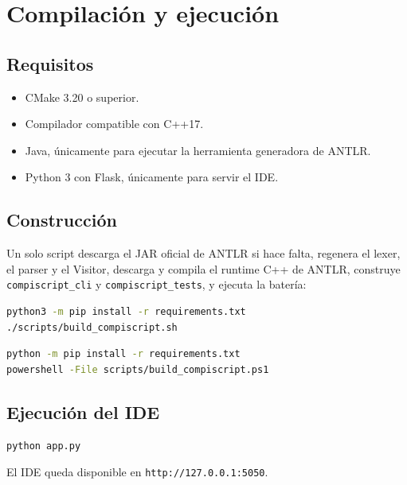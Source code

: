 \documentclass[11pt,a4paper]{article}
\begin{document}
\section{Compilación y ejecución}

\subsection{Requisitos}

\begin{itemize}[leftmargin=1.4em]
  \item CMake 3.20 o superior.
  \item Compilador compatible con C++17.
  \item Java, únicamente para ejecutar la herramienta generadora de ANTLR.
  \item Python 3 con Flask, únicamente para servir el IDE.
\end{itemize}

\subsection{Construcción}

Un solo script descarga el JAR oficial de ANTLR si hace falta, regenera el
lexer, el parser y el Visitor, descarga y compila el runtime C++ de ANTLR,
construye \texttt{compiscript\_cli} y \texttt{compiscript\_tests}, y ejecuta la
batería:

\begin{lstlisting}[language=bash,caption={macOS o Linux.}]
python3 -m pip install -r requirements.txt
./scripts/build_compiscript.sh
\end{lstlisting}

\begin{lstlisting}[language=bash,caption={Windows PowerShell.}]
python -m pip install -r requirements.txt
powershell -File scripts/build_compiscript.ps1
\end{lstlisting}

\subsection{Ejecución del IDE}

\begin{lstlisting}[language=bash,caption={Servidor del IDE.}]
python app.py
\end{lstlisting}

El IDE queda disponible en \texttt{http://127.0.0.1:5050}.
\end{document}
